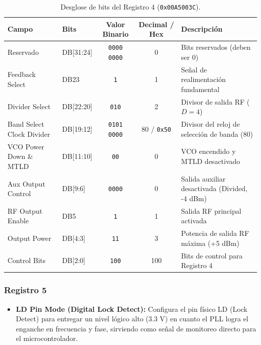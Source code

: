 \documentclass[11pt,a4paper,twoside]{report}
\begin{document}
	\begin{table}[htbp]
		\centering
		\begin{tabularx}{\textwidth}{l l c c X}
			\toprule
			\textbf{Campo} & \textbf{Bits} & \textbf{Valor Binario} & \textbf{Decimal / Hex} & \textbf{Descripción} \\
			\midrule
			Reservado & DB[31:24] & \texttt{0000 0000} & 0 & Bits reservados (deben ser 0) \\
			Feedback Select & DB23 & \texttt{1} & 1 & Señal de realimentación fundamental \\
			Divider Select & DB[22:20] & \texttt{010} & 2 & Divisor de salida RF ($D = 4$) \\
			Band Select Clock Divider & DB[19:12] & \texttt{0101 0000} & 80 / \texttt{0x50} & Divisor del reloj de selección de banda ($80$) \\
			VCO Power Down \& MTLD & DB[11:10] & \texttt{00} & 0 & VCO encendido y MTLD desactivado \\
			Aux Output Control & DB[9:6] & \texttt{0000} & 0 & Salida auxiliar desactivada (Divided, -4 dBm) \\
			RF Output Enable & DB5 & \texttt{1} & 1 & Salida RF principal activada \\
			Output Power & DB[4:3] & \texttt{11} & 3 & Potencia de salida RF máxima (+5 dBm) \\
			Control Bits & DB[2:0] & \texttt{100} & 100 & Bits de control para Registro 4 \\
			\bottomrule
		\end{tabularx}
		\caption{Desglose de bits del Registro 4 (\texttt{0x00A5003C}).}
		\label{tab:adf4350_reg4}
	\end{table}\newpage
	
	\subsubsection{Registro 5}
	\begin{itemize}
		\item \textbf{LD Pin Mode (Digital Lock Detect):} Configura el pin físico LD (Lock Detect) para entregar un nivel lógico alto (3.3 V) en cuanto el PLL logra el enganche en frecuencia y fase, sirviendo como señal de monitoreo directo para el microcontrolador.
	\end{itemize}
	
\end{document}
